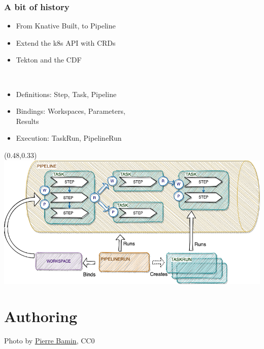 \documentclass[aspectratio=169,11pt,hyperref={colorlinks=true}]{beamer}
\begin{document}
\begin{lgrayrwhiteframe}
  \frametitle{A bit of history}
  \begin{itemize}
    \item From Knative Built, to Pipeline
    \item Extend the k8s API with CRDs
    \item Tekton and the CDF
  \end{itemize}
  \vspace{0.03\paperheight}
  ~~~~~
  \vspace{0.03\paperheight}
  \begin{itemize}
    \item Definitions: Step, Task, Pipeline
    \item Bindings: Workspaces, Parameters, \\Results
    \item Execution: TaskRun, PipelineRun
  \end{itemize}
  \begin{textblock*}{0.51\paperwidth}(0.48\paperwidth,0.33\paperheight)
    \includegraphics[width=0.5\paperwidth]{img/tekton-workspaces.png}
  \end{textblock*}
\end{lgrayrwhiteframe}

\section[Authoring]{Authoring}

\begin{sectionwithpicrx}{Photo by \href{https://unsplash.com/@bamin}{\underline{Pierre Bamin}}, CC0}
\end{sectionwithpicrx}
\end{document}
